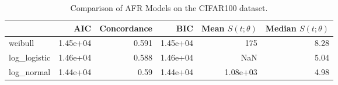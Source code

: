 \begin{table*}
\centering
\caption{Comparison of AFR Models on the CIFAR100 dataset.}
\label{tab:cifar100}
\begin{tabular}{lrrrrr}
\toprule
{} &      AIC &  Concordance &      BIC &  Mean $S(t;\theta)$ &  Median $S(t;\theta)$ \\
\midrule
weibull      & 1.45e+04 &        0.591 & 1.45e+04 &                 175 &                  8.28 \\
log\_logistic & 1.46e+04 &        0.588 & 1.46e+04 &                 NaN &                  5.04 \\
log\_normal   & 1.44e+04 &         0.59 & 1.44e+04 &            1.08e+03 &                  4.98 \\
\bottomrule
\end{tabular}
\end{table*}
